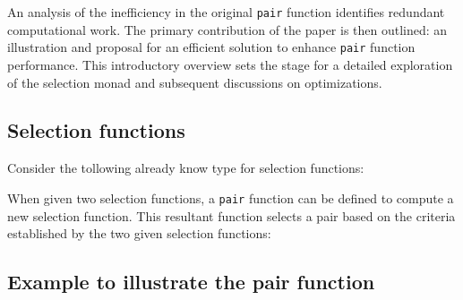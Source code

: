 \documentclass[runningheads]{llncs}
\begin{document}
An analysis of the inefficiency in the original \texttt{pair} function
identifies redundant computational work. The primary contribution of the
paper is then outlined: an illustration and proposal for an efficient
solution to enhance \texttt{pair} function performance. This
introductory overview sets the stage for a detailed exploration of the
selection monad and subsequent discussions on optimizations.

\subsection{Selection functions}\label{selection-functions}

Consider the tollowing already know type for selection functions:

\begin{Shaded}
\begin{Highlighting}[]
 \OtherTok{=}\OtherTok{{-}\textgreater{}}\OtherTok{{-}\textgreater{}}
\end{Highlighting}
\end{Shaded}

When given two selection functions, a \texttt{pair} function can be
defined to compute a new selection function. This resultant function
selects a pair based on the criteria established by the two given
selection functions:

\begin{Shaded}
\begin{Highlighting}[]
 \OtherTok{{-}\textgreater{}} \OtherTok{{-}\textgreater{}} 
\OtherTok{=}
\OtherTok{=}\OtherTok{{-}\textgreater{}}\OtherTok{{-}\textgreater{}}
\OtherTok{=}\OtherTok{{-}\textgreater{}}
\end{Highlighting}
\end{Shaded}

\subsection{Example to illustrate the pair
function}\label{example-to-illustrate-the-pair-function}
\end{document}
